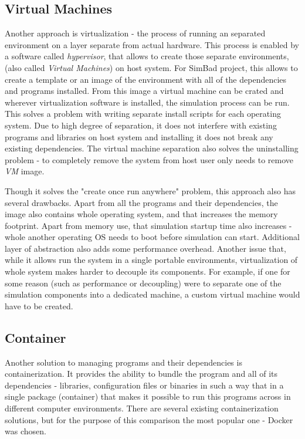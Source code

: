 \subsection{Virtual Machines}
Another approach is virtualization - the process of running an separated environment on a layer separate from actual hardware. This process is enabled by a software called \textit{hypervisor}, that allows to create those separate environments, (also called \textit{Virtual Machines}) on host system. For SimBad project, this allows to create a template or an image of the environment with all of the dependencies and programs installed. From this image a virtual machine can be crated and wherever virtualization software is installed, the simulation process can be run. This solves a problem with writing separate install scripts for each operating system. Due to high degree of separation, it does not interfere with existing programs and libraries on host system and installing it does not break any existing dependencies. The virtual machine separation also solves the uninstalling problem - to completely remove the system from host user only needs to remove \textit{VM} image. 

Though it solves the "create once run anywhere" problem, this approach also has several drawbacks. Apart from all the programs and their dependencies, the image also contains whole operating system, and that increases the memory footprint. Apart from memory use, that simulation startup time also increases - whole another operating OS needs to boot before simulation can start. Additional layer of abstraction also adds some performance overhead. Another issue that, while it allows run the system in a single portable environments, virtualization of whole system makes harder to decouple its components. For example, if one for some reason (such as performance or decoupling) were to separate one of the simulation components into a dedicated machine, a custom virtual machine would have to be created. 
\subsection{Container}
Another solution to managing programs and their dependencies is containerization. It provides the ability to bundle the program and all of its dependencies - libraries, configuration files or binaries in such a way that in a single package (container) that makes it possible to run this programs across in different computer environments. There are several existing containerization solutions, but for the purpose of this comparison the most popular one - Docker was chosen.


